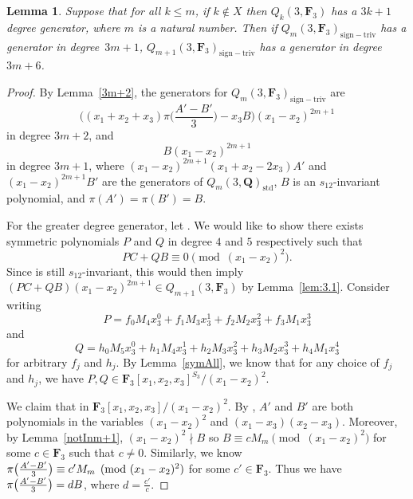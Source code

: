 \documentclass[pdftex]{sigma}
\newtheorem{Lemma}[Theorem]{Lemma}
\theoremstyle{definition}
\numberwithin{equation}{section}
\newcommand{\std}{\mathrm{std}}
\newcommand{\siv}{\mathrm{sign-triv}}
\begin{document}
\begin{Lemma}\label{3m+6}
 Suppose that for all $k\leq m$, if $k\not\in X$ then $Q_k(3,\mathbf{F}_3)$ has a $3k+1$ degree generator, where $m$ is a natural number. Then if $Q_m(3,\mathbf{F}_3)_{\siv}$ has a generator in degree~${3m+1}$, $Q_{m+1}(3,\mathbf{F}_3)_{\siv}$ has a generator in degree $3m+6$.
\end{Lemma}
\begin{proof}
 By Lemma~\ref{3m+2}, the generators for $Q_m(3,\mathbf{F}_3)_{\siv}$ are
 \[\biggl((x_1+x_2+x_3)\pi\biggl(\frac{A'-B'}{3}\biggr)-x_3B\biggr)(x_1-x_2)^{2m+1}\]
 in degree $3m+2$, and
 \[B(x_1-x_2)^{2m+1}\]
 in degree $3m+1$, where $(x_1-x_2)^{2m+1}(x_1+x_2-2x_3)A'$ and $(x_1-x_2)^{2m+1}B'$ are the generators of $Q_m(3,\mathbf{Q})_{\std}$, $B$ is an $s_{12}$-invariant polynomial, and $\pi(A')=\pi(B')=B$.

 For the greater degree generator, let . We would like to show there exists symmetric polynomials $P$ and $Q$ in degree $4$ and $5$ respectively such that
 \[PC+QB \equiv 0\pmod{(x_1-x_2)^2}.\]
 Since  is still $s_{12}$-invariant, this would then imply $(PC+QB)(x_1-x_2)^{2m+1}\in Q_{m+1}(3,\mathbf{F}_3)$ by Lemma~\ref{lem:3.1}. Consider writing
 \[P=f_0M_4x_3^0+f_1M_{3}x_3^1 + f_{2}M_2x_3^{2}+f_{3}M_1x_3^{3}\]
 and
 \[Q=h_0M_5x_3^0+h_1M_4x_3^1+h_2M_3x_3^2+h_3M_2x_3^3+h_4M_1x_3^4\]
 for arbitrary $f_j$ and $h_j$. By Lemma~\ref{symAll}, we know that for any choice of $f_j$ and $h_j$, we have $P,Q\in \mathbf{F}_3[x_1,x_2,x_3]^{S_3}/(x_1-x_2)^2$.

 We claim that  in $\mathbf{F}_3[x_1,x_2,x_3]/(x_1-x_2)^2$. By \cite{wang2022explicit}, $A'$ and $B'$ are both polynomials in the variables $(x_1-x_2)^2$ and $(x_1-x_3)(x_2-x_3)$. Moreover, by Lemma~\ref{notInm+1}, $(x_1-x_2)^2\nmid B$ so $B\equiv cM_{m}\pmod{(x_1-x_2)^2}$ for some $c\in \mathbf{F}_3$ such that $c\neq 0 $. Similarly, we know $\smash{\pi\big(\frac{A'-B'}{3}\big)} \equiv c'M_{m}\pmod{(x_1-x_2)^2}$ for some $c'\in \mathbf{F}_3$. Thus we have $\smash{\pi\big(\frac{A'-B'}{3}\big)} = dB$, where $d=\frac{c'}{c}$.


\end{proof}
\end{document}
